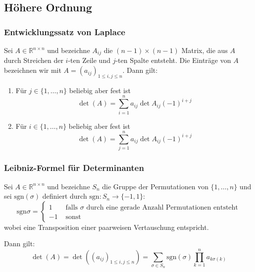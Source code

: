 \subsection{Höhere Ordnung}
\subsubsection{Entwicklungssatz von Laplace}
Sei $A \in \mathbb{R}^{n \times n}$ und bezeichne $A_{ij}$ die $(n-1)\times(n-1)$ Matrix, die aus $A$ durch Streichen
der $i$-ten Zeile und $j$-ten Spalte entsteht. Die Einträge von $A$ bezeichnen wir mit $A = (a_{ij})_{1 \leq i,j \leq n}$. Dann gilt:
\begin{enumerate}[label= (\alph*)]
    \item Für $j \in \{1, \ldots, n \}$ beliebig aber fest ist
        \begin{equation*}
            \det(A) = \sum_{i=1}^n a_{ij} \det{A_{ij}} {(-1)}^{i+j}
        \end{equation*}
    \item Für $i \in \{1, \ldots, n \}$ beliebig aber fest ist
        \begin{equation*}
            \det(A) = \sum_{j=1}^n a_{ij} \det{A_{ij}} {(-1)}^{i+j}
        \end{equation*}
\end{enumerate}

\subsubsection{Leibniz-Formel für Determinanten}
Sei $A \in \mathbb{R}^{n \times n}$ und bezeichne $S_n$ die Gruppe der Permutationen von
$\{1, \ldots, n\}$ und sei $\text{sgn}(\sigma)$ definiert durch $\text{sgn}: S_n \to \{-1, 1\}$:
\begin{equation*}
    \text{sgn}{\sigma} = \begin{cases}
        1 & \text{ falls $\sigma$ durch eine gerade Anzahl Permutationen entsteht} \\
        -1 & \text{ sonst}
    \end{cases}
\end{equation*}
wobei eine Transposition einer paarweisen Vertauschung entspricht.

Dann gilt:
\begin{equation*}
    \det(A) = \det((a_{ij})_{1\leq  i,j \leq n}) = 
    \sum_{\sigma \in S_n} \text{sgn}(\sigma) \prod_{k=1}^n a_{k\sigma(k)}
\end{equation*}
